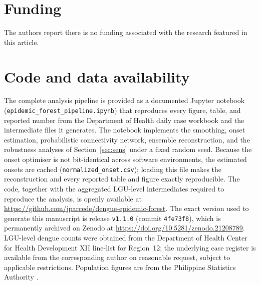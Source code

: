 \documentclass[a4paper,11pt]{article}
\begin{document}
\section*{Funding}
The authors report there is no funding associated with the research featured in
this article.

\section*{Code and data availability}
The complete analysis pipeline is provided as a documented Jupyter notebook
(\texttt{epidemic\_\allowbreak forest\_\allowbreak pipeline\allowbreak.ipynb}) that reproduces every figure, table, and
reported number from the Department of Health daily case workbook and the
intermediate files it generates. The notebook implements the smoothing, onset
estimation, probabilistic connectivity network, ensemble reconstruction, and the
robustness analyses of Section~\ref{sec:sens} under a fixed random seed. Because the
onset optimiser is not bit-identical across software environments, the estimated
onsets are cached (\texttt{normalized\_onset.csv}); loading this file makes the
reconstruction and every reported table and figure exactly reproducible.
The code, together with the aggregated LGU-level intermediates required to reproduce
the analysis, is openly available at
\url{https://github.com/jparcede/dengue-epidemic-forest}. The exact version used to
generate this manuscript is release \texttt{v1.1.0} (commit \texttt{4fe73f8}), which
is permanently archived on Zenodo at
\url{https://doi.org/10.5281/zenodo.21208789}. LGU-level dengue counts
were obtained from the Department of Health Center for Health Development XII
line-list for Region~12; the underlying case register is available from the
corresponding author on reasonable request, subject to applicable restrictions.
Population figures are from the Philippine Statistics Authority \cite{PSA2015}.

\end{document}
